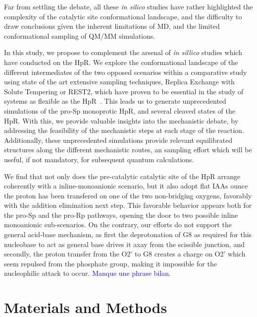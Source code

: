 \documentclass[journal=jacsat,manuscript=article]{achemso}
\def\selrev#1{\textcolor{blue}{#1}}
\begin{document}
Far from settling the debate, 
all these \textit{in silico} studies have rather highlighted the complexity of the catalytic site conformational landscape,
and the difficulty to draw conclusions given the inherent limitations of MD,
and the limited conformational sampling of QM/MM simulations.


In this study, we propose to complement the arsenal of \textit{in sillico} studies 
which have conducted on the HpR. 
We explore the conformational landscape of the different intermediates of the two opposed scenarios within a comparative study
using state of the art extensive sampling techniques, Replica Exchange with Solute Tempering or REST2, which have proven to be essential in the study of systems as flexible as the HpR~\cite{forget2024simulation}. 
This leads us to generate unprecedented simulations of the pro-Sp monoprotic HpR, and several cleaved states of the HpR.
With this, we provide valuable insights into the mechanistic debate, 
by addressing the feasibility of the mechanistic steps at each stage of the reaction.
Additionally, these unprecedented simulations provide relevant equilibrated structures along the different mechanistic routes,
an sampling effort which will be useful, if not mandatory, for subsequent quantum calculations.

We find that not only does the pre-catalytic catalytic site of the HpR arrange coherently with a inline-monoanionic scenario, 
but it also adopt flat IAAs ounce the proton has been transfered on one of the two non-bridging oxygens, favorably with the addition elimination next step. 
This favorable behavior appears both for the pro-Sp and the pro-Rp pathways, opening the door to two possible inline monoanionic sub-scenarios.
On the contrary, our efforts do not support the general acid-base mechanism, 
as first the deprotonation of G8 as required for this nucleobase to act as general base drives it axay from the scissible junction, and secondly,
the proton transfer from the O2' to G8 creates a charge on O2' which seem repulsed from the phosphate group,
making it impossible for the nucleophilic attack to occur.
\selrev{Manque une phrase bilan.}





\section{Materials and Methods}
\end{document}
